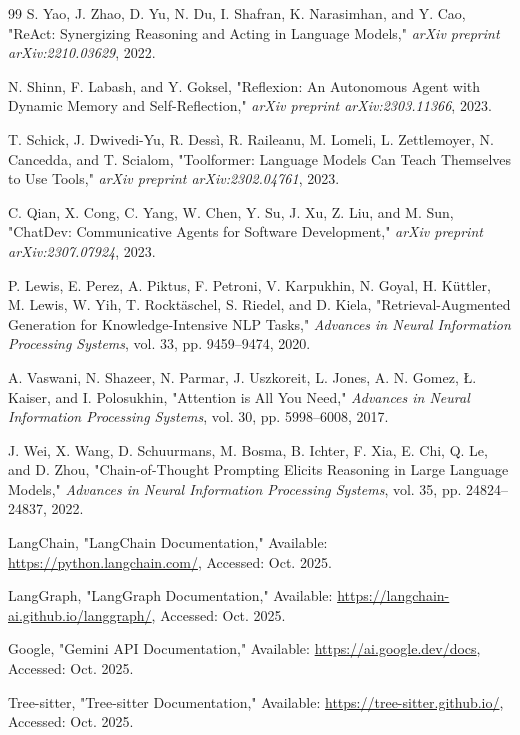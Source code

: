\begin{thebibliography}{99}
S. Yao, J. Zhao, D. Yu, N. Du, I. Shafran, K. Narasimhan, and Y. Cao, "ReAct: Synergizing Reasoning and Acting in Language Models,"
\textit{arXiv preprint arXiv:2210.03629}, 2022.

N. Shinn, F. Labash, and Y. Goksel, "Reflexion: An Autonomous Agent with Dynamic Memory and Self-Reflection,"
\textit{arXiv preprint arXiv:2303.11366}, 2023.

T. Schick, J. Dwivedi-Yu, R. Dessì, R. Raileanu, M. Lomeli, L. Zettlemoyer, N. Cancedda, and T. Scialom, "Toolformer: Language Models Can Teach Themselves to Use Tools,"
\textit{arXiv preprint arXiv:2302.04761}, 2023.

C. Qian, X. Cong, C. Yang, W. Chen, Y. Su, J. Xu, Z. Liu, and M. Sun, "ChatDev: Communicative Agents for Software Development,"
\textit{arXiv preprint arXiv:2307.07924}, 2023.

P. Lewis, E. Perez, A. Piktus, F. Petroni, V. Karpukhin, N. Goyal, H. Küttler, M. Lewis, W. Yih, T. Rocktäschel, S. Riedel, and D. Kiela, "Retrieval-Augmented Generation for Knowledge-Intensive NLP Tasks,"
\textit{Advances in Neural Information Processing Systems}, vol. 33, pp. 9459--9474, 2020.

A. Vaswani, N. Shazeer, N. Parmar, J. Uszkoreit, L. Jones, A. N. Gomez, Ł. Kaiser, and I. Polosukhin, "Attention is All You Need,"
\textit{Advances in Neural Information Processing Systems}, vol. 30, pp. 5998--6008, 2017.

J. Wei, X. Wang, D. Schuurmans, M. Bosma, B. Ichter, F. Xia, E. Chi, Q. Le, and D. Zhou, "Chain-of-Thought Prompting Elicits Reasoning in Large Language Models,"
\textit{Advances in Neural Information Processing Systems}, vol. 35, pp. 24824--24837, 2022.

LangChain, "LangChain Documentation,"
Available: \url{https://python.langchain.com/}, Accessed: Oct. 2025.

LangGraph, "LangGraph Documentation,"
Available: \url{https://langchain-ai.github.io/langgraph/}, Accessed: Oct. 2025.

Google, "Gemini API Documentation,"
Available: \url{https://ai.google.dev/docs}, Accessed: Oct. 2025.

Tree-sitter, "Tree-sitter Documentation,"
Available: \url{https://tree-sitter.github.io/}, Accessed: Oct. 2025.

\end{thebibliography}